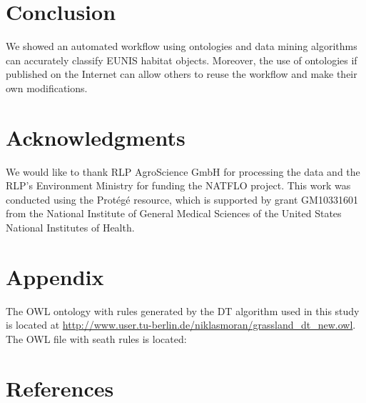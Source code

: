 \documentclass[authoryear, review,12pt,number]{elsarticle}
\begin{document}
\section{Conclusion}
We showed an automated workflow using ontologies and data mining algorithms can 
accurately classify EUNIS habitat objects. Moreover, the use of ontologies if 
published on the Internet can allow others to reuse the workflow and make their 
own modifications. 
\section{Acknowledgments}
We would like to thank RLP AgroScience GmbH for processing the data and the
RLP's Environment Ministry for funding the NATFLO project. This work was
conducted using the Prot\'eg\'e resource, which is supported by grant GM10331601
from the National Institute of General Medical Sciences of the United States
National
Institutes of Health.
\section{Appendix}
The OWL ontology with rules generated by the DT algorithm used in this study 
is located at 
\url{http://www.user.tu-berlin.de/niklasmoran/grassland_dt_new.owl}. The OWL 
file with seath rules is located: 


\section{References}  
\end{document}
